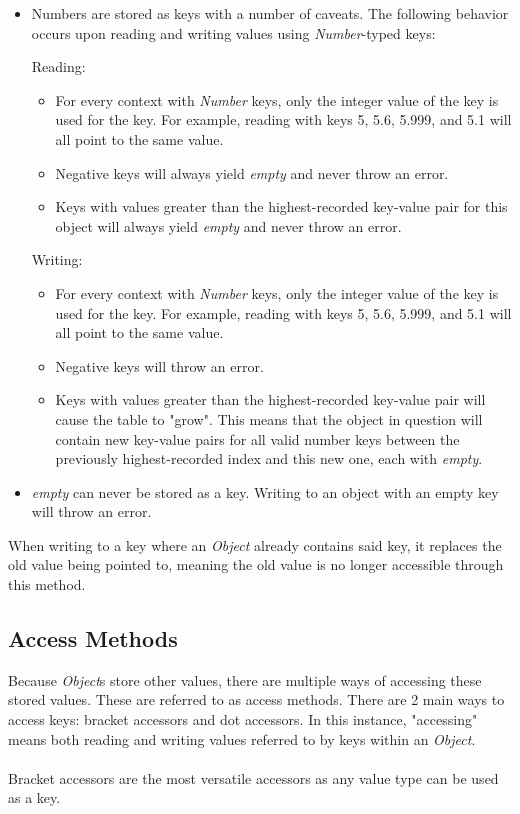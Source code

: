 \documentclass[12pt,letterpaper]{report}
\begin{document}
\begin{itemize}
  \item Numbers are stored as keys with a number of caveats. The following behavior occurs 
  upon reading and writing values using \textit{Number}-typed keys:
  
  Reading:
  \begin{itemize}
    \item For every context with \textit{Number} keys, only the integer value of the key is used for the key. For example, reading with keys 5, 5.6, 5.999, and 5.1 will all point to the same value.    
    \item Negative keys will always yield \textit{empty} and never throw an error.
    \item Keys with values greater than the highest-recorded key-value pair for this object will always yield \textit{empty} and never throw an error.      
  \end{itemize}

  Writing:
  \begin{itemize}
    \item For every context with \textit{Number} keys, only the integer value of the key is used for the key. For example, reading with keys 5, 5.6, 5.999, and 5.1 will all point to the same value.    
    \item Negative keys will throw an error.
    \item Keys with values greater than the highest-recorded key-value pair will cause the table to "grow". This means that the object in question will contain new key-value pairs for all valid number keys between the previously highest-recorded index and this new one, each with \textit{empty}.
  \end{itemize}

  \item \textit{empty} can never be stored as a key. Writing to an object with an empty key will throw an error.
\end{itemize}

When writing to a key where an \textit{Object} already contains said key, it replaces the old value being pointed to, meaning the old value 
is no longer accessible through this method.

\subsection{Access Methods}\label{Access Methods}

Because \textit{Object}s store other values, there are multiple ways of accessing these stored values. These are referred to 
as access methods. There are 2 main ways to access keys: bracket accessors and dot accessors.
In this instance, "accessing" means both reading and writing values referred to by keys within an \textit{Object}.
\\\\
Bracket accessors are the most versatile accessors as any value type can be used as a key.
\\\\

\end{document}
